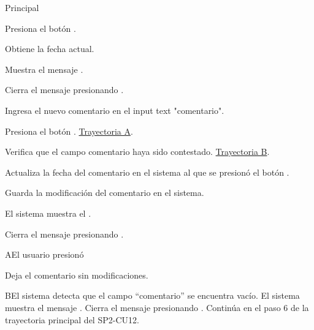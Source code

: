\begin{UCtrayectoria}{Principal}


    \UCpaso[\UCactor] Presiona el botón . 
    
    \UCpaso Obtiene la fecha actual. 
    
    \UCpaso Muestra el mensaje .

    \UCpaso[\UCactor] Cierra el mensaje presionando .
    
    \UCpaso[\UCactor] Ingresa el nuevo comentario en el input text "comentario".
    
    \UCpaso[\UCactor] Presiona el botón . \hyperref[SP2-CU12-A]{Trayectoria A}.
    
    \UCpaso Verifica que el campo comentario haya sido contestado. \hyperref[SP2-CU12-B]{Trayectoria B}.

    \UCpaso Actualiza la fecha del comentario en el sistema al que se presionó el botón .

    \UCpaso Guarda la modificación del comentario en el sistema.

    \UCpaso El sistema muestra el  .

    \UCpaso[\UCactor] Cierra el mensaje presionando .


\end{UCtrayectoria}


\label{SP2-CU12-A}
\begin{UCtrayectoriaA}{A}{El usuario presionó }

  \UCpaso Deja el comentario sin modificaciones.
\end{UCtrayectoriaA}

\label{SP2-CU12-B}
\begin{UCtrayectoriaA}{B}{El sistema detecta que el campo “comentario” se encuentra vacío.} 
    \UCpaso El sistema muestra el mensaje .
    \UCpaso[\UCactor] Cierra el mensaje presionando .
    \UCpaso Continúa en el paso 6 de la trayectoria principal del SP2-CU12.
\end{UCtrayectoriaA}
